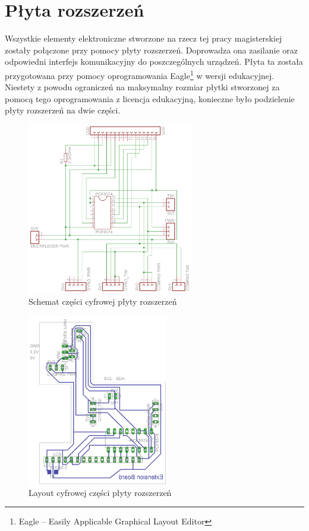 \section{Płyta rozszerzeń}
Wszystkie elementy elektroniczne stworzone na rzecz tej pracy magisterskiej zostały połączone przy pomocy płyty rozszerzeń. Doprowadza ona zasilanie oraz odpowiedni interfejs komunikacyjny do poszczególnych urządzeń. Płyta ta została przygotowana przy pomocy oprogramowania Eagle\footnote{Eagle -- Easily Applicable Graphical Layout Editor} w wersji edukacyjnej. Niestety z powodu ograniczeń na maksymalny rozmiar płytki stworzonej za pomocą tego oprogramowania z licencja edukacyjną, konieczne było podzielenie płyty rozszerzeń na dwie części. 

\begin{figure}[!ht]
 \centering
 \includegraphics[height=75mm]{../images/ch04/extension_board-sch.png}
 \caption{Schemat części cyfrowej płyty rozszerzeń}
 \label{fig:ExtBoardSch}
\end{figure}

\begin{figure}[!ht]
 \centering
 \includegraphics[height=75mm]{../images/ch04/extension_board.png}
 \caption{Layout cyfrowej części płyty rozszerzeń}
 \label{fig:ExtBoardPCB}
\end{figure}

